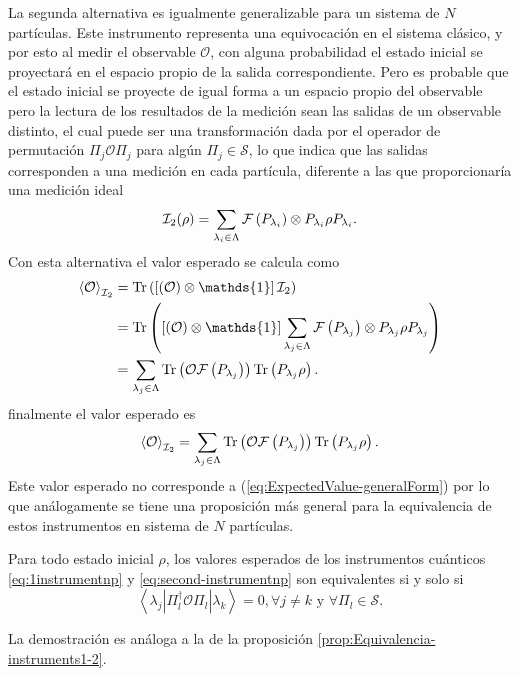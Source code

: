 La segunda alternativa es igualmente generalizable para un sistema de $N$
partículas. Este instrumento representa una equivocación en el sistema clásico,
y por esto al medir el observable $\mathcal{O}$, con alguna probabilidad el
estado inicial se proyectará en el espacio propio de la salida correspondiente.
Pero es probable que el estado inicial se proyecte de igual forma a un espacio
propio del observable pero la lectura de los resultados de la medición sean las
salidas de un observable distinto, el cual puede ser una transformación dada
por el operador de permutación $\Pi_j\mathcal{O}\Pi_j$ para algún $\Pi_j\in
\mathcal{S}$, lo que indica que las salidas corresponden a una medición en cada
partícula, diferente a las que proporcionaría una medición ideal
\begin{equation}\label{eq:second-instrumentnp}
    \mathcal{I}_2(\rho)= \sum_{\lambda_i \in \Lambda } \mathcal{F}\left(P_{\lambda_i}\right)\otimes P_{\lambda_i}\rho P_{\lambda_i}.
\end{equation} 
Con esta alternativa el valor esperado se calcula como 
\begin{equation*}
    \begin{split}
        \left \la \mathcal{O} \right \ra_{\mathcal{I}_2}&=\tr\left( \left[\left(\mathcal{O}\right) \otimes \mathds{1}\right]\mathcal{I}_2\right) \\
        &=\tr\left(\left[ \left(\mathcal{O}\right)\otimes \mathds{1}\right]\sum_{\lambda_j \in \Lambda}\fuzzy{P_{\lambda_j}}\otimes P_{\lambda_j}{\rho}P_{\lambda_j} \right)\\
        &=\sum_{\lambda_j\in \Lambda} \tr\left(\mathcal{O}\fuzzy{P_{\lambda_j}}\right) \tr\left(P_{\lambda_j}\rho\right). \\
    \end{split}
\end{equation*} 
finalmente el valor esperado es \begin{equation}\label{eq:valor-esperado-2instrumentnp}
    \left \langle \mathcal{O}\right \rangle_{\mathcal{I}_2}=\sum_{\lambda_j\in \Lambda} {\rm Tr}\left(\mathcal{O}\mathcal{F}\left(P_{\lambda_j}\right)\right) {\rm Tr}\left(P_{\lambda_j}\rho\right).
\end{equation} 
Este valor esperado no corresponde a (\ref{eq:ExpectedValue-generalForm}) por
lo que análogamente se tiene una proposición más general para la equivalencia
de estos instrumentos en sistema de $N$ partículas.

\begin{proposition}\label{prop:Equivalencia-instrumentos-np}
    Para todo estado inicial $\rho$, los valores esperados de los instrumentos
cuánticos {\ref{eq:1instrumentnp}} y {\ref{eq:second-instrumentnp}} son
equivalentes si y solo si \[\left \langle \lambda_j \left|\Pi_l^\dagger
\mathcal{O} \Pi_l\right|\lambda_k\right\rangle=0,\forall j\ne k \text{ y }
\forall \Pi_l \in \mathcal{S}.\]
\end{proposition} 
La demostración es análoga a la de la proposición {\ref{prop:Equivalencia-instruments1-2}}.



